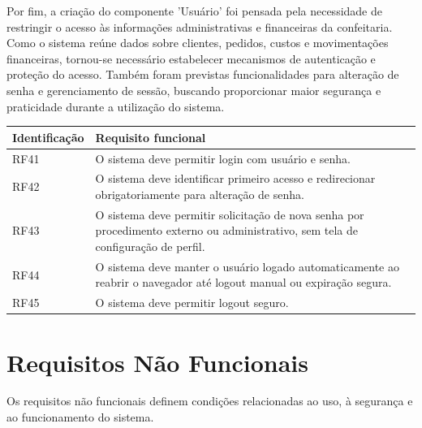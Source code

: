 Por fim, a criação do componente 'Usuário' foi pensada pela necessidade de restringir o acesso às informações administrativas e financeiras da confeitaria. Como o sistema reúne dados sobre clientes, pedidos, custos e movimentações financeiras, tornou-se necessário estabelecer mecanismos de autenticação e proteção do acesso. Também foram previstas funcionalidades para alteração de senha e gerenciamento de sessão, buscando proporcionar maior segurança e praticidade durante a utilização do sistema.


\begin{quadro}
    \centering
    \label{quadro:rf_usuario}

    \begin{tabular}{|p{3cm}|p{11cm}|}
        \hline
        \textbf{Identificação} & \textbf{Requisito funcional} \\ \hline

        RF41 & O sistema deve permitir login com usuário e senha. \\ \hline

        RF42 & O sistema deve identificar primeiro acesso e redirecionar obrigatoriamente para alteração de senha. \\ \hline

        RF43 & O sistema deve permitir solicitação de nova senha por procedimento externo ou administrativo, sem tela de configuração de perfil.  \\ \hline

        RF44 & O sistema deve manter o usuário logado automaticamente ao reabrir o navegador até logout manual ou expiração segura. \\ \hline

        RF45 & O sistema deve permitir logout seguro. \\ \hline
    \end{tabular}

    \vspace{0.2cm}
\end{quadro}


\section{Requisitos Não Funcionais}

Os requisitos não funcionais definem condições relacionadas ao uso, à segurança e ao funcionamento do sistema.

